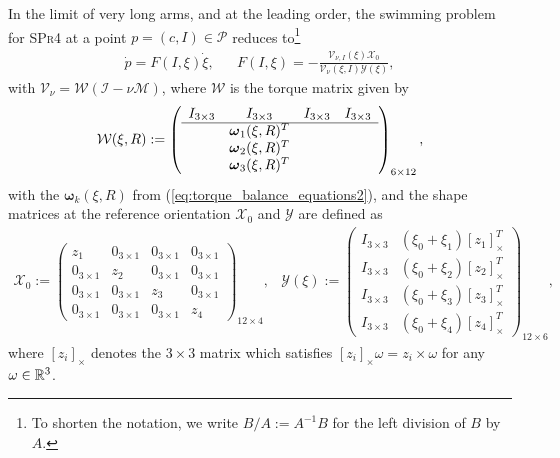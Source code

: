 \begin{proposition}
\label{prop:control_system_laa}
In the limit of very long arms, and at the leading order, the swimming problem for \textsc{SPr4} at a point $p = (c, I) \in \mathcal{P}$ reduces to\footnote{To shorten the notation, we write $B/A := A^{-1} B$ for the left division of $B$ by $A$.}
\begin{eqnarray}
\label{eq:control_system_laa}
	\dot{p} = F(I, \xi) \dot{\xi}, & &  F(I, \xi) = - \frac{\mathcal{V}_{\nu, I}( \xi) \mathcal{X}_0}{\mathcal{V}_{\nu}(\xi, I) \mathcal{Y}(\xi)},
\end{eqnarray}
with $\mathcal{V}_{\nu} = \mathcal{W} (\mathcal{I} - \nu \mathcal{M})$, where $\mathcal{W}$ is the torque matrix given by
\begin{align}
\mathcal{W}(\xi, R) := \left (\begin{array}{cccc}
I_{3 \times 3} & I_{3 \times 3} & I_{3 \times 3} & I_{3 \times 3} \\ 
\hline
 & \boldsymbol \omega_1(\xi, R)^T &  &  \\ 
 & \boldsymbol \omega_2(\xi, R)^T & & \\ 
& \boldsymbol \omega_3(\xi, R)^T & & 
\end{array}  \right )_{6 \times 12},
\end{align}
with the $\boldsymbol \omega_{k}(\xi, R)$ from  (\ref{eq:torque_balance_equations2}), and the shape matrices at the reference orientation $\mathcal{X}_0$ and $\mathcal{Y}$ are defined as
\begin{eqnarray}
 \mathcal{X}_0 := \left ( \begin{array}{cccc}
 z_1 & 0_{3 \times 1} & 0_{3 \times 1} & 0_{3 \times 1} \\ 
 0_{3 \times 1} & z_2 & 0_{3 \times 1} & 0_{3 \times 1} \\ 
 0_{3 \times 1} & 0_{3 \times 1} & z_3 & 0_{3 \times 1} \\ 
 0_{3 \times 1} & 0_{3 \times 1} & 0_{3 \times 1} & z_4
 \end{array} \right )_{12 \times 4}, &  \mathcal{Y}(\xi) := \left ( \begin{array}{c|c}
 I_{3 \times 3} & (\xi_0 + \xi_1)[z_1]^T_\times \\ 
 I_{3 \times 3} & (\xi_0 + \xi_2)[z_2]^T_\times \\ 
 I_{3 \times 3} & (\xi_0 + \xi_3)[z_3]^T_\times \\ 
 I_{3 \times 3} & (\xi_0 + \xi_4)[z_4]^T_\times
 \end{array} \right )_{12 \times 6},
\end{eqnarray}
where $[z_i]_{\times}$ denotes the $3 \times 3$ matrix which satisfies $[z_i]_{\times} \omega = z_i \times \omega $ for any $\omega \in \mathbb{R}^3$.
\end{proposition}

